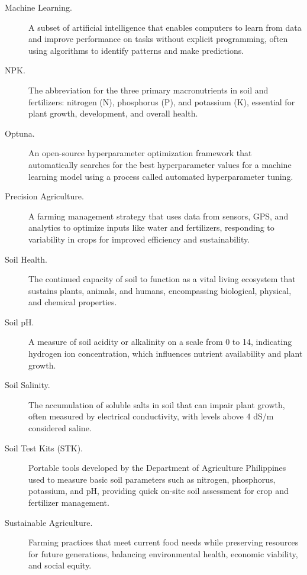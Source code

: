{\begin{description}
		\item[Machine Learning.] 
		A subset of artificial intelligence that enables computers to learn from data and improve performance on tasks without explicit programming, often using algorithms to identify patterns and make predictions.
		\item[NPK.]
		The abbreviation for the three primary macronutrients in soil and fertilizers: nitrogen (N), phosphorus (P), and potassium (K), essential for plant growth, development, and overall health.
		\item[Optuna.] 
		An open-source hyperparameter optimization framework that automatically searches for the best hyperparameter values for a machine learning model using a process called automated hyperparameter tuning. 
		\item[Precision Agriculture.]
		A farming management strategy that uses data from sensors, GPS, and analytics to optimize inputs like water and fertilizers, responding to variability in crops for improved efficiency and sustainability.
		\item[Soil Health.]
		The continued capacity of soil to function as a vital living ecosystem that sustains plants, animals, and humans, encompassing biological, physical, and chemical properties.
		\item[Soil pH.]
		A measure of soil acidity or alkalinity on a scale from 0 to 14, indicating hydrogen ion concentration, which influences nutrient availability and plant growth.
		\item[Soil Salinity.]
		The accumulation of soluble salts in soil that can impair plant growth, often measured by electrical conductivity, with levels above 4 dS/m considered saline.
		\item[Soil Test Kits (STK).] 
		Portable tools developed by the Department of Agriculture Philippines used to measure basic soil parameters such as nitrogen, phosphorus, potassium, and pH, providing quick on-site soil assessment for crop and fertilizer management.
		\item[Sustainable Agriculture.]
		Farming practices that meet current food needs while preserving resources for future generations, balancing environmental health, economic viability, and social equity.	
	\end{description}
}